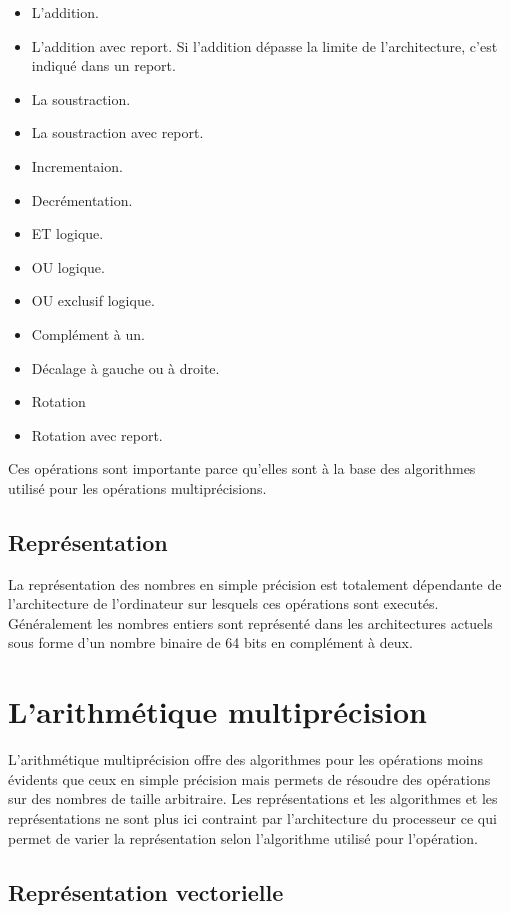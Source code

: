 \documentclass[letterpaper]{article}
\begin{document}
\begin{itemize}
  \item L'addition.
  \item L'addition avec report. Si l'addition dépasse la limite de
    l'architecture, c'est indiqué dans un report.
  \item La soustraction.
  \item La soustraction avec report.
  \item Incrementaion.
  \item Decrémentation.
  \item ET logique.
  \item OU logique.
  \item OU exclusif logique.
  \item Complément à un.
  \item Décalage à gauche ou à droite.
  \item Rotation
  \item Rotation avec report.
\end{itemize}

Ces opérations sont importante parce qu'elles sont à la base des algorithmes
utilisé pour les opérations multiprécisions.

\subsection{Représentation}

La représentation des nombres en simple précision est totalement dépendante de
l'architecture de l'ordinateur sur lesquels ces opérations sont executés.
Généralement les nombres entiers sont représenté dans les architectures actuels
sous forme d'un nombre binaire de 64 bits en complément à deux.

\section{L'arithmétique multiprécision}

L'arithmétique multiprécision offre des algorithmes pour les opérations moins
évidents que ceux en simple précision mais permets de résoudre des opérations
sur des nombres de taille arbitraire. Les représentations et les algorithmes et
les représentations ne sont plus ici contraint par l'architecture du processeur
ce qui permet de varier la représentation selon l'algorithme utilisé pour
l'opération.

\subsection{Représentation vectorielle}
\end{document}
